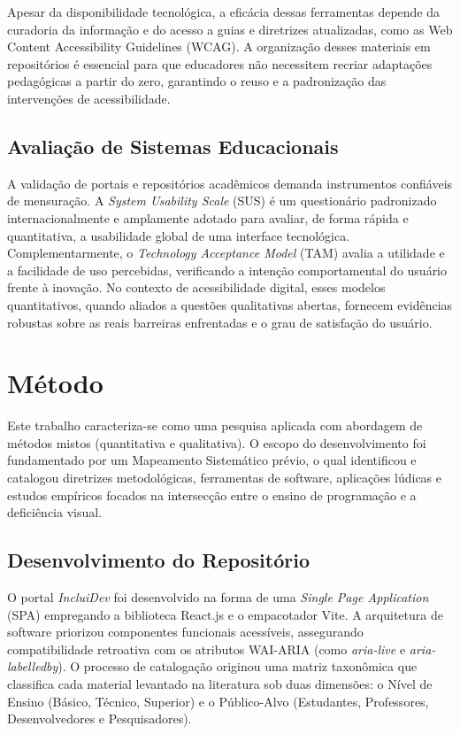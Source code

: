 \documentclass[12pt, a4paper, oneside]{article}
\begin{document}
Apesar da disponibilidade tecnológica, a eficácia dessas ferramentas depende da curadoria da informação e do acesso a guias e diretrizes atualizadas, como as Web Content Accessibility Guidelines (WCAG). A organização desses materiais em repositórios é essencial para que educadores não necessitem recriar adaptações pedagógicas a partir do zero, garantindo o reuso e a padronização das intervenções de acessibilidade.

\subsection{Avaliação de Sistemas Educacionais}
A validação de portais e repositórios acadêmicos demanda instrumentos confiáveis de mensuração. A \textit{System Usability Scale} (SUS) é um questionário padronizado internacionalmente e amplamente adotado para avaliar, de forma rápida e quantitativa, a usabilidade global de uma interface tecnológica. Complementarmente, o \textit{Technology Acceptance Model} (TAM) avalia a utilidade e a facilidade de uso percebidas, verificando a intenção comportamental do usuário frente à inovação. No contexto de acessibilidade digital, esses modelos quantitativos, quando aliados a questões qualitativas abertas, fornecem evidências robustas sobre as reais barreiras enfrentadas e o grau de satisfação do usuário.

\section{Método}
Este trabalho caracteriza-se como uma pesquisa aplicada com abordagem de métodos mistos (quantitativa e qualitativa). O escopo do desenvolvimento foi fundamentado por um Mapeamento Sistemático prévio, o qual identificou e catalogou diretrizes metodológicas, ferramentas de software, aplicações lúdicas e estudos empíricos focados na intersecção entre o ensino de programação e a deficiência visual.

\subsection{Desenvolvimento do Repositório}
O portal \textit{IncluiDev} foi desenvolvido na forma de uma \textit{Single Page Application} (SPA) empregando a biblioteca React.js e o empacotador Vite. A arquitetura de software priorizou componentes funcionais acessíveis, assegurando compatibilidade retroativa com os atributos WAI-ARIA (como \textit{aria-live} e \textit{aria-labelledby}). O processo de catalogação originou uma matriz taxonômica que classifica cada material levantado na literatura sob duas dimensões: o Nível de Ensino (Básico, Técnico, Superior) e o Público-Alvo (Estudantes, Professores, Desenvolvedores e Pesquisadores).
\end{document}
